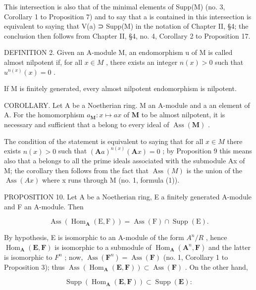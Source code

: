 This intersection is also that of the minimal elements of Supp(M) (no. 3, Corollary 1 to Proposition 7) and to say that a is contained in this intersection is equivalent to saying that V(a) ⊃ Supp(M) in the notation of Chapter II, §4; the conclusion then follows from Chapter II, §4, no. 4, Corollary 2 to Proposition 17.

DEFINITION 2. Given an A-module M, an endomorphism u of M is called almost nilpotent if, for all \(x \in M\) , there exists an integer \(n(x) > 0\) such that \(u^{n(x)}(x) = 0\) .

If M is finitely generated, every almost nilpotent endomorphism is nilpotent.

COROLLARY. Let A be a Noetherian ring. M an A-module and a an element of A. For the homomorphism \(a_{\mathbf{M}}: x \mapsto ax\) of \(\mathbf{M}\) to be almost nilpotent, it is necessary and sufficient that a belong to every ideal of \(\operatorname{Ass}(\mathbf{M})\) .

The condition of the statement is equivalent to saying that for all \(x \in M\) there exists \(n(x) > 0\) such that \((\mathbf{A}a)^{n(x)}(\mathbf{A}x) = 0\) ; by Proposition 9 this means also that a belongs to all the prime ideals associated with the submodule Ax of M; the corollary then follows from the fact that \(\operatorname{Ass}(M)\) is the union of the \(\operatorname{Ass}(Ax)\) where x runs through M (no. 1, formula (1)).

PROPOSITION 10. Let A be a Noetherian ring, E a finitely generated A-module and F an A-module. Then

\[
\operatorname{Ass} \left(\operatorname{Hom} _ {\mathbf {A}} (\mathrm{E}, \mathrm{F})\right) = \operatorname{Ass} (\mathrm{F}) \cap \operatorname{Supp} (\mathrm{E}).\tag{5}
\]

By hypothesis, E is isomorphic to an A-module of the form \(A^{n}/R\) , hence \(\operatorname{Hom}_{\mathbf{A}}(\mathbf{E}, \mathbf{F})\) is isomorphic to a submodule of \(\operatorname{Hom}_{\mathbf{A}}(\mathbf{A}^{n}, \mathbf{F})\) and the latter is isomorphic to \(F^{n}\) ; now, \(\operatorname{Ass}(\mathbf{F}^{n}) = \operatorname{Ass}(\mathbf{F})\) (no. 1, Corollary 1 to Proposition 3); thus \(\operatorname{Ass}(\operatorname{Hom}_{\mathbf{A}}(\mathbf{E}, \mathbf{F})) \subset \operatorname{Ass}(\mathbf{F})\) . On the other hand,

\[
\operatorname{Supp} (\operatorname{Hom} _ {\mathbf {A}} (\mathbf {E}, \mathbf {F})) \subset \operatorname{Supp} (\mathbf {E}):
\]

